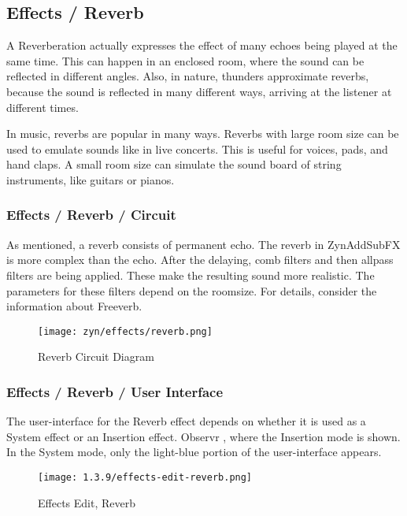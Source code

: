 \subsection{Effects / Reverb}
\label{subsec:effects_edit_reverb}

   A Reverberation actually expresses the effect of many echoes being played
   at the same time. This can happen in an enclosed room, where the sound can
   be reflected in different angles. Also, in nature, thunders approximate
   reverbs, because the sound is reflected in many different ways, arriving
   at the listener at different times.

   In music, reverbs are popular in many ways. Reverbs with large room size
   can be used to emulate sounds like in live concerts. This is useful for
   voices, pads, and hand claps. A small room size can simulate the sound
   board of string instruments, like guitars or pianos.

\subsubsection{Effects / Reverb / Circuit}
\label{subsubsec:effects_edit_reverb_circuit}

   As mentioned, a reverb consists of permanent echo. The reverb in
   ZynAddSubFX is more complex than the echo. After the delaying, comb
   filters and then allpass filters are being applied. These make the
   resulting sound more realistic. The parameters for these filters depend on
   the roomsize. For details, consider the information about Freeverb.

\begin{figure}[H]
   \centering 
   \texttt{[image: zyn/effects/reverb.png]}
   \caption{Reverb Circuit Diagram}
   \label{fig:reverb_circuit_diagram}
\end{figure}

\subsubsection{Effects / Reverb / User Interface}
\label{subsubsec:effects_edit_reverb_ui}

   The user-interface for the Reverb effect depends on whether it is used as a
   System effect or an Insertion effect.
   Observr , where
   the Insertion mode is shown.  In the System mode, only the light-blue
   portion of the user-interface appears.

\begin{figure}[H]
   \centering 
   \texttt{[image: 1.3.9/effects-edit-reverb.png]}
   \caption{Effects Edit, Reverb}
   \label{fig:effects_edit_reverb}
\end{figure}

